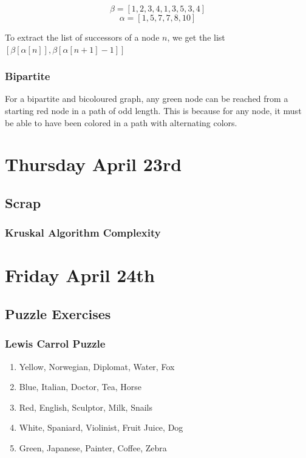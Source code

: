 \documentclass[11pt]{article}
\begin{document}
\begin{equation}
    \beta = [1, 2, 3, 4, 1, 3, 5, 3, 4]
\end{equation}
\begin{equation}
    \alpha = [1, 5, 7, 7, 8, 10]
\end{equation}

To extract the list of successors of a node $n$, we get the list $[\beta[\alpha[n]], \beta[\alpha[n+1] - 1]]$

\subsubsection{Bipartite}
For a bipartite and bicoloured graph, any green node can be reached from a starting red node in a path of odd length.
This is because for any node, it must be able to have been colored in a path with alternating colors.

\section{Thursday April 23rd}
\subsection{Scrap}
\subsubsection{Kruskal Algorithm Complexity}

\section{Friday April 24th}
\subsection{Puzzle Exercises}
\subsubsection{Lewis Carrol Puzzle}
\begin{enumerate}
    \item Yellow, Norwegian, Diplomat, Water, Fox
    \item  Blue, Italian, Doctor, Tea, Horse
    \item  Red, English, Sculptor, Milk, Snails
    \item  White, Spaniard, Violinist, Fruit Juice, Dog
    \item  Green, Japanese, Painter, Coffee, Zebra
\end{enumerate}
\end{document}
